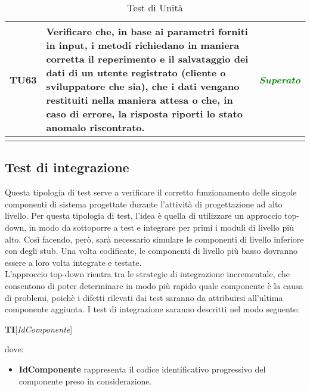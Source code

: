 \begin{longtable}{|>{\centering\arraybackslash}p{1.5cm}|>{\centering\arraybackslash}p{8cm} | >{\centering\arraybackslash}p{3.8cm}|}
		\hypertarget{TU63}{TU63} & Verificare che, in base ai parametri forniti in input, i metodi richiedano in maniera corretta il reperimento e il salvataggio dei dati di un utente registrato (cliente o sviluppatore che sia), che i dati vengano restituiti nella maniera attesa o che, in caso di errore, la risposta riporti lo stato anomalo riscontrato. & \textcolor{Green}{\textit{Superato}}\\ \hline

		\caption[Test di Unità]{Test di Unità}
		\label{tabella:test3}
	\end{longtable}
	\clearpage
	
	\subsection{Test di integrazione}
	Questa tipologia di test serve a verificare il corretto funzionamento delle singole componenti di sistema progettate durante l'attività di progettazione ad alto livello. Per questa tipologia di test, l'idea è quella di utilizzare un approccio top-down, in modo da sottoporre a test e integrare per primi i moduli di livello più alto.
	Così facendo, però, sarà necessario simulare le componenti di livello inferiore con degli stub. Una volta codificate, le componenti di livello più basso dovranno essere a loro volta integrate e testate.\\
	L'approccio top-down rientra tra le strategie di integrazione incrementale, che consentono di poter determinare in modo più rapido quale componente è la causa di problemi, poichè i difetti rilevati dai test saranno da attribuirsi all'ultima componente aggiunta.
	I test di integrazione saranno descritti nel modo seguente:
	\begin{center}
		\textbf{TI}[\textit{IdComponente}]
	\end{center}
	dove:
	\begin{itemize}
		\item
		\textbf{IdComponente} rappresenta il codice identificativo progressivo del componente preso in considerazione.
	\end{itemize}
	
